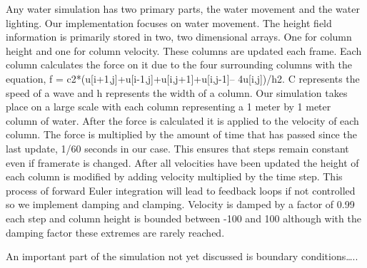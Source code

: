 \documentclass[12pt,titlepage]{article}
\begin{document}
Any water simulation has two primary parts, the water movement and the water lighting.  Our implementation focuses on water movement.  The height field information is primarily stored in two, two dimensional arrays.  One for column height and one for column velocity.  These columns are updated each frame.  Each column calculates the force on it due to the four surrounding columns with the equation, f = c2*(u[i+1,j]+u[i-1,j]+u[i,j+1]+u[i,j-1]– 4u[i,j])/h2.  C represents the speed of a wave and h represents the width of a column.  Our simulation takes place on a large scale with each column representing a 1 meter by 1 meter column of water.  After the force is calculated it is applied to the velocity of each column.  The force is multiplied by the amount of time that has passed since the last update, 1/60 seconds in our case.  This ensures that steps remain constant even if framerate is changed.  After all velocities have been updated the height of each column is modified by adding velocity multiplied by the time step.  This process of forward Euler integration will lead to feedback loops if not controlled so we implement damping and clamping.  Velocity is damped by a factor of 0.99 each step and column height is bounded between -100 and 100 although with the damping factor these extremes are rarely reached.


An important part of the simulation not yet discussed is boundary conditions…..
\end{document}
